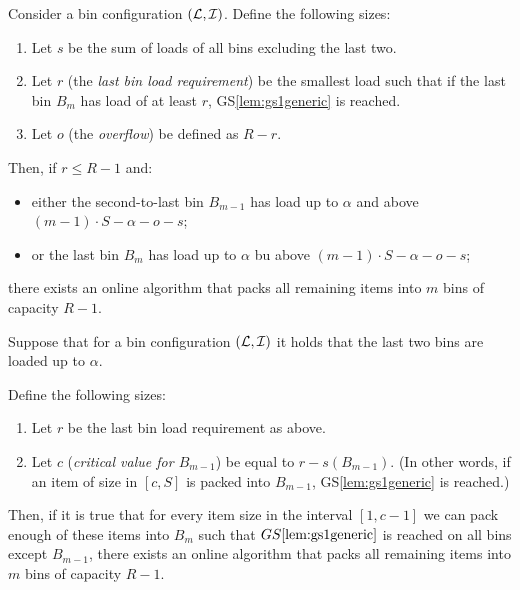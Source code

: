 
\begin{goodsit}\label{lem:gs3generic}
Consider a bin configuration $({\mathcal L},{\mathcal I})$. Define the following
sizes:

\begin{enumerate}
\item Let $s$ be the sum of loads of all bins excluding the last two.
\item Let $r$ (the \emph{last bin load requirement}) be
the smallest load such that if the last bin $B_m$ has load of at least $r$,
GS\ref{lem:gs1generic} is reached.
\item Let $o$ (the \emph{overflow}) be defined as $R-r$.
\end{enumerate}

Then, if $r \le R-1$ and:

\begin{itemize}
\item either the second-to-last bin $B_{m-1}$ has load up to $\alpha$
and above $(m-1)\cdot S - \alpha - o - s$;
\item or the last bin $B_m$ has load up to $\alpha$
bu above $(m-1)\cdot S - \alpha - o - s$;
\end{itemize}

there exists an online algorithm that packs all remaining items into
$m$ bins of capacity $R-1$.
\end{goodsit}

\begin{goodsit}\label{lem:gs4generic}

Suppose that for a bin configuration $({\mathcal L}, {\mathcal I})$ it holds that
the last two bins are loaded up to $\alpha$. 

Define the following sizes:

\begin{enumerate}
\item Let $r$ be the last bin load requirement as above.
\item Let $c$ (\emph{critical value for $B_{m-1}$}) be equal to $r - s(B_{m-1})$.
(In other words, if an item of size in $[c,S]$ is packed into $B_{m-1}$, GS\ref{lem:gs1generic}
is reached.)
\end{enumerate}

Then, if it is true that for every item size in the interval $[1,c-1]$
we can pack enough of these items into $B_{m}$ such that
$GS\ref{lem:gs1generic}$ is reached on all bins except $B_{m-1}$,
there exists an online algorithm that packs all remaining items into
$m$ bins of capacity $R-1$.

\end{goodsit}

